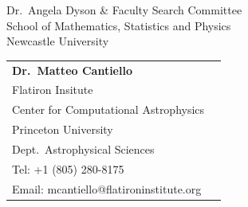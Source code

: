 \documentclass[12pt, a4paper]{letter}
\begin{document}
\begin{letter}{
        Dr.~Angela Dyson \& Faculty Search Committee \\
        School of Mathematics, Statistics and Physics \\
        Newcastle University}
\begin{tabular}{ll}
        \textbf{Dr.~Matteo Cantiello}                          & \\
         Flatiron Insitute                                     & \\
         \hspace{0.2in}Center for Computational Astrophysics   & \\
         Princeton University                                  & \\
         \hspace{0.2in}Dept.~Astrophysical Sciences & \\
         Tel: +1 (805) 280-8175  & \\
         Email: mcantiello@flatironinstitute.org & \\
    \end{tabular}

    \normalsize


\end{letter}
\end{document}
